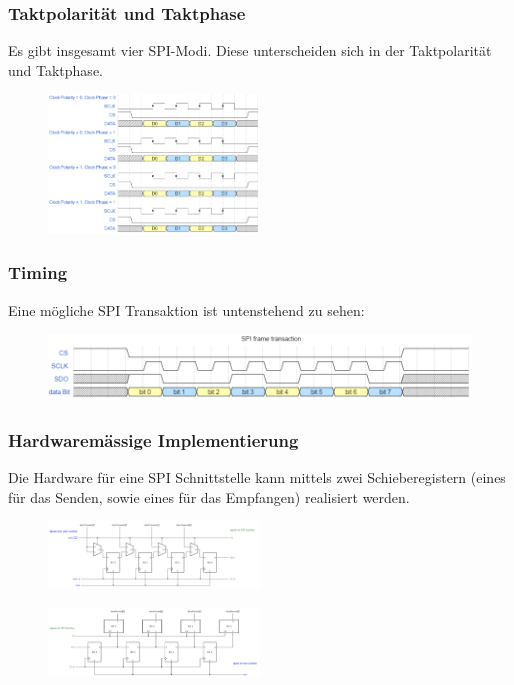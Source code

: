 \subsubsection{Taktpolarität und Taktphase}
Es gibt insgesamt vier SPI-Modi. Diese unterscheiden sich in der Taktpolarität und Taktphase.
\begin{figure}[H]
    \includegraphics[width=0.5\textwidth]{images/spi_taktphase.png}
\end{figure}

\subsubsection{Timing}
Eine mögliche SPI Transaktion ist untenstehend zu sehen:
\begin{figure}[H]
    \includegraphics[width=1\textwidth]{images/spi_timing.png}
\end{figure}

\subsubsection{Hardwaremässige Implementierung}
Die Hardware für eine SPI Schnittstelle kann mittels zwei Schieberegistern (eines für das Senden, sowie eines für das Empfangen) realisiert werden.
\begin{multicols}{2}
    \begin{figure}[H]
        \includegraphics[width=0.5\textwidth]{images/spi_shift1.png}
    \end{figure}
    \begin{figure}[H]
        \includegraphics[width=0.5\textwidth]{images/spi_shift2.png}
    \end{figure}
\end{multicols}


